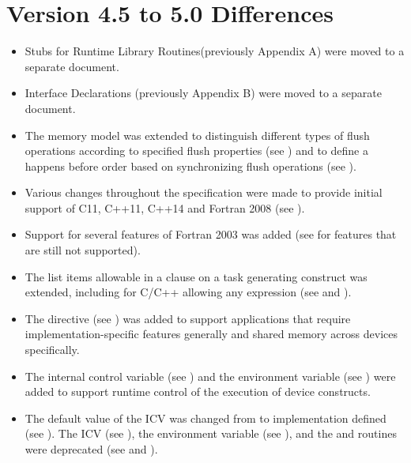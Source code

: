 \section{Version 4.5 to 5.0 Differences}
\label{sec:Version 4.5 to 5.0 Differences}
\begin{itemize}
\item Stubs for Runtime Library Routines(previously Appendix A) were moved to a separate document.
\item Interface Declarations (previously Appendix B) were moved to a separate document.

\item The memory model was extended to distinguish different types of flush
      operations according to specified flush properties (see
      ) and to define a happens
      before order based on synchronizing flush operations
      (see ).

\item Various changes throughout the specification were made to provide
      initial support of C11, C++11, C++14 and Fortran 2008 (see
      ).

\item Support for several features of Fortran 2003 was added (see
       for features that are still
      not supported).

\item The list items allowable in a  clause on a task generating
      construct was extended, including for C/C++ allowing any 
      expression (see  and
      ).

\item The  directive (see ) was
      added to support applications that require implementation-specific
      features generally and shared memory across devices specifically.

\item The  internal control variable (see
      ) and the
       environment variable (see
      ) were added to support runtime
      control of the execution of device constructs.

\item The default value of the  ICV was changed from 
      to implementation defined (see ).
      The  ICV (see ), the
       environment variable (see ),
      and the  and  routines
      were deprecated (see  and
      ).


\end{itemize}
